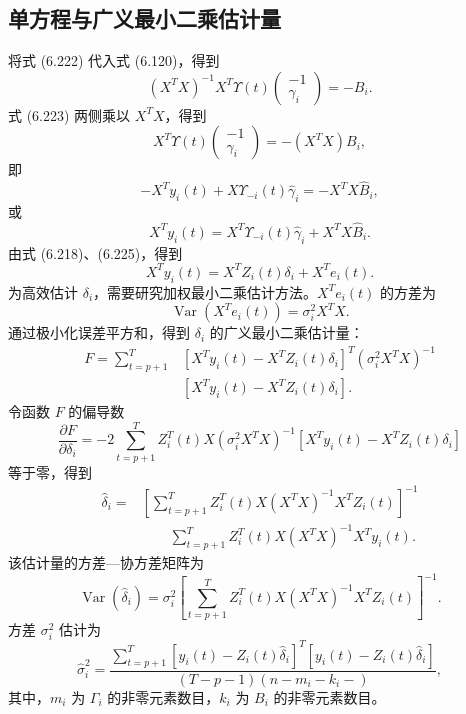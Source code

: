 \subsection{单方程与广义最小二乘估计量}

将式 (6.222) 代入式 (6.120)，得到
\begin{equation}
(X^TX)^{-1}X^T\Upsilon(t)\begin{pmatrix}-1\\\gamma_i\end{pmatrix}=-B_i.
\tag{6.223}
\end{equation}
式 (6.223) 两侧乘以 $X^TX$，得到
\begin{equation}
X^T\Upsilon(t)\begin{pmatrix}-1\\\gamma_i\end{pmatrix}=-(X^TX)B_i,
\tag{6.224}
\end{equation}
即
\[
-X^Ty_i(t)+X\Upsilon_{-i}(t)\widehat\gamma_i=-X^TX\widehat B_i,
\]
或
\begin{equation}
X^Ty_i(t)=X^T\Upsilon_{-i}(t)\widehat\gamma_i+X^TX\widehat B_i.
\tag{6.225}
\end{equation}
由式 (6.218)、(6.225)，得到
\begin{equation}
X^Ty_i(t)=X^TZ_i(t)\delta_i+X^Te_i(t).
\tag{6.226}
\end{equation}
为高效估计 $\delta_i$，需要研究加权最小二乘估计方法。$X^Te_i(t)$ 的方差为
\begin{equation}
\operatorname{Var}(X^Te_i(t))=\sigma_i^2X^TX.
\tag{6.227}
\end{equation}
通过极小化误差平方和，得到 $\delta_i$ 的广义最小二乘估计量：
\begin{equation}
\begin{aligned}
F=\sum_{t=p+1}^T&[X^Ty_i(t)-X^TZ_i(t)\delta_i]^T(\sigma_i^2X^TX)^{-1}\\
&[X^Ty_i(t)-X^TZ_i(t)\delta_i].
\end{aligned}\tag{6.228}
\end{equation}
令函数 $F$ 的偏导数
\[
\frac{\partial F}{\partial\delta_i}=-2\sum_{t=p+1}^TZ_i^T(t)X(\sigma_i^2X^TX)^{-1}[X^Ty_i(t)-X^TZ_i(t)\delta_i]
\]
等于零，得到
\begin{equation}
\begin{aligned}
\widehat\delta_i=&\left[\sum_{t=p+1}^TZ_i^T(t)X(X^TX)^{-1}X^TZ_i(t)\right]^{-1}\\
&\qquad\sum_{t=p+1}^TZ_i^T(t)X(X^TX)^{-1}X^Ty_i(t).
\end{aligned}\tag{6.229}
\end{equation}
该估计量的方差—协方差矩阵为
\begin{equation}
\operatorname{Var}(\widehat\delta_i)=\sigma_i^2\left[\sum_{t=p+1}^TZ_i^T(t)X(X^TX)^{-1}X^TZ_i(t)\right]^{-1}.
\tag{6.230}
\end{equation}
方差 $\sigma_i^2$ 估计为
\begin{equation}
\widehat\sigma_i^2=\frac{\displaystyle\sum_{t=p+1}^T[y_i(t)-Z_i(t)\widehat\delta_i]^T[y_i(t)-Z_i(t)\widehat\delta_i]}{(T-p-1)(n-m_i-k_i-)},
\tag{6.231}
\end{equation}
其中，$m_i$ 为 $\Gamma_i$ 的非零元素数目，$k_i$ 为 $B_i$ 的非零元素数目。
